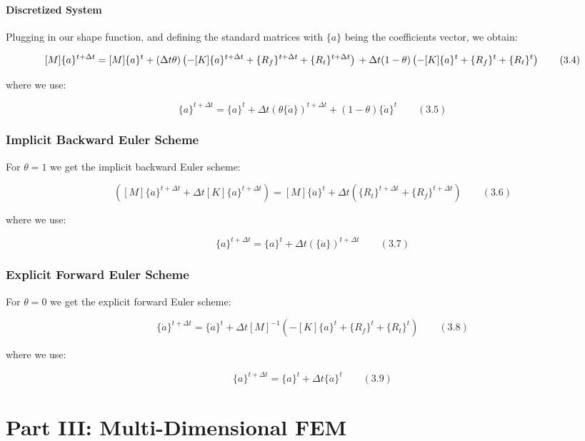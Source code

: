 \documentclass[
  11pt,
  a4paper,
]{scrbook}
\begin{document}
\subsection{Discretized System}\label{discretized-system}

Plugging in our shape function, and defining the standard matrices with
\(\{a\}\) being the coefficients vector, we obtain:

\[
[M]\{a\}^{t+\Delta t} = [M]\{a\}^t + (\Delta t \theta) \left( -[K]\{a\}^{t+\Delta t} + \{R_f\}^{t+\Delta t} + \{R_t\}^{t+\Delta t} \right) \\
+ \Delta t (1 - \theta) \left( -[K]\{a\}^t + \{R_f\}^t + \{R_t\}^t \right) \qquad (3.4)
\]

where we use:

\[
\{a\}^{t+\Delta t} = \{a\}^{t}+\Delta t (\theta \{\dot{a}\})^{t+\Delta t} + (1 - \theta) \{\dot{a}\}^{t} \qquad (3.5)
\]

\section{Implicit Backward Euler
Scheme}\label{implicit-backward-euler-scheme}

For \(\theta=1\) we get the implicit backward Euler scheme:

\[
\left( [M]\{\ddot{a}\}^{t+\Delta t} + \Delta t [K]\{a\}^{t+\Delta t} \right) = [M]\{\ddot{a}\}^t + \Delta t \left( \{R_t\}^{t+\Delta t} + \{R_f\}^{t+\Delta t} \right) \qquad (3.6)
\]

where we use:

\[
\{a\}^{t+\Delta t} = \{a\}^{t}+\Delta t (\{\dot{a}\})^{t+\Delta t}  \qquad (3.7)
\]

\section{Explicit Forward Euler
Scheme}\label{explicit-forward-euler-scheme}

For \(\theta=0\) we get the explicit forward Euler scheme:

\[
\{\dot{a}\}^{t+\Delta t} = \{\dot{a}\}^t + \Delta t [M]^{-1} \left( -[K]\{a\}^t + \{R_f\}^t + \{R_t\}^t \right) \qquad (3.8)
\]

where we use:

\[
\{a\}^{t+\Delta t} = \{a\}^t + \Delta t \{\dot{a}\}^t \qquad (3.9)
\]

\part{Part III: Multi-Dimensional FEM}
\end{document}
